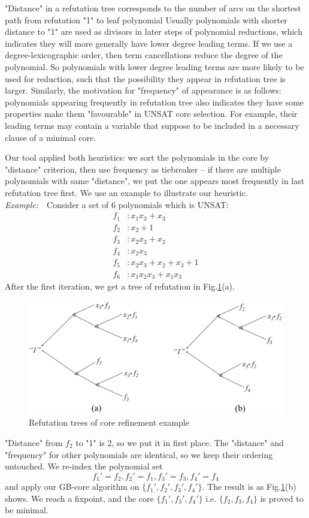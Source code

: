 "Distance" in a refutation tree corresponds to the number of arcs on the shortest path from refutation "1"
to leaf polynomial
Usually polynomials with shorter distance to "1" are used as divisors in later steps of polynomial reductions,
which indicates they will more generally have lower degree leading terms. 
If we use a degree-lexicographic order, then term cancellations reduce the degree of the polynomial. So polynomials with lower degree leading terms are more 
likely to be used for reduction, such that the possibility they appear in refutation tree is larger. 
Similarly, the motivation for "frequency" of appearance is as follows:
polynomials appearing frequently in refutation tree also indicates they have some properties make
them "favourable" in UNSAT core selection. For example, their leading terms may contain a variable that suppose to be included in a necessary clause of a minimal core. 

Our tool applied both heuristics: we sort the polynomials in the core by "distance" criterion,
then use frequency as tiebreaker -- if there are multiple polynomials with same "distance", we put the one appears most frequently in last refutation tree first. 
We use an example to illustrate our heuristic.
\vspace{5mm}\\
{\it Example:}\ \ Consider a set of 6 polynomials which is UNSAT:
\begin{align*}
f_1 &: x_1x_3+x_3\\
f_2 &: x_2 + 1\\
f_3 &: x_2x_3+x_2\\
f_4 &: x_2x_3\\
f_5 &: x_2x_3 + x_2 + x_3 + 1\\
f_6 &: x_1x_2x_3 +x_1x_3
\end{align*}
After the first iteration, we get a tree of refutation in Fig.\ref{fig:refine}(a). 
\begin{figure}[hbt]
\centering
\includegraphics[scale=0.25]{core_refine.eps}
\caption{Refutation trees of core refinement example}
\label{fig:refine}
\end{figure}
"Distance" from $f_2$ to "1" is 2, so we put it in first place. The "distance" and "frequency" for other 
polynomials are identical, so we keep their ordering untouched. We re-index the polynomial set
$$f_1'=f_2, f_2' = f_1, f_3' = f_3, f_4' = f_4$$
and apply our GB-core algorithm on $\{f_1',f_2',f_3',f_4'\}$. The result is as
Fig.\ref{fig:refine}(b) shows. We reach a fixpoint, and the core $\{f_1', f_3', f_4'\}$ i.e. $\{f_2,f_3,f_4\}$ is proved to be minimal.